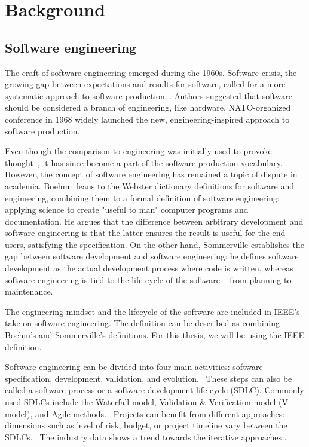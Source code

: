 \chapter{Background}

\section{Software engineering}

The craft of software engineering emerged during the 1960s. Software crisis, the growing gap between expectations and results for software, called for a more systematic approach to software production~\cite{mcclure_nato_1968}. Authors suggested that software should be considered a branch of engineering, like hardware. NATO-organized conference in 1968 widely launched the new, engineering-inspired approach to software production.

Even though the comparison to engineering was initially used to provoke thought~\cite{mcclure_nato_1968}, it has since become a part of the software production vocabulary. However, the concept of software engineering has remained a topic of dispute in academia. Boehm~\cite{boehm_software_1979} leans to the Webster dictionary definitions for software and engineering, combining them to a formal definition of software engineering: applying science to create "useful to man" computer programs and documentation. He argues that the difference between arbitrary development and software engineering is that the latter ensures the result is useful for the end-users, satisfying the specification. On the other hand, Sommerville establishes the gap between software development and software engineering: he defines software development as the actual development process where code is written, whereas software engineering is tied to the life cycle of the software – from planning to maintenance.~\cite{sommerville_software_2016}

The engineering mindset and the lifecycle of the software are included in IEEE's take on software engineering. The definition can be described as combining Boehm's and Sommerville's definitions. For this thesis, we will be using the IEEE definition.~\cite{noauthor_ieee_1990}

Software engineering can be divided into four main activities: software specification, development, validation, and evolution.~\cite{sommerville_software_2016} These steps can also be called a software process or a software development life cycle (SDLC). Commonly used SDLCs include the Waterfall model, Validation \& Verification model (V model), and Agile methods.~\cite{balaji_waterfall_2012} Projects can benefit from different approaches: dimensions such as level of risk, budget, or project timeline vary between the SDLCs.~\cite{alshamrani_comparison_2015, cohen_introduction_2004} The industry data shows a trend towards the iterative approaches \cite{sommerville_software_2016}. 

